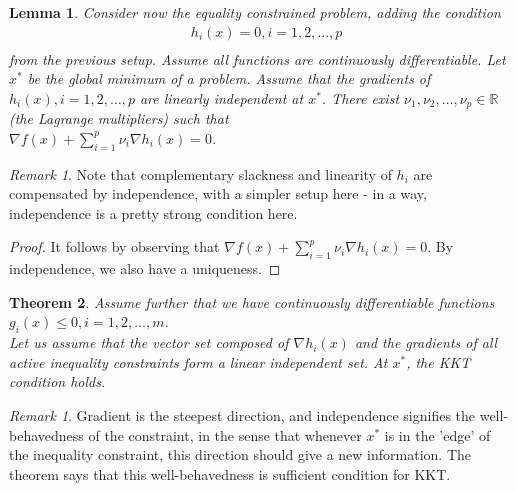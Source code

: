 \documentclass{article}
\newtheorem{theorem}{Theorem}
\newtheorem{lemma}[theorem]{Lemma}
\theoremstyle{remark}
\newtheorem{remark}[example]{Remark}
\begin{document}
\begin{lemma}
Consider now the equality constrained problem, adding the condition\\
\begin{align*}
        & h_i(x)=0,i=1,2,\dots,p\\
\end{align*}
from the previous setup. Assume all functions are continuously differentiable. 
Let $x^*$ be the global minimum of a problem. Assume that
 the gradients of $h_i(x),i=1,2,\dots,p$ are linearly independent at $x^*$. There
  exist $\nu_1,\nu_2,\dots,\nu_p\in\mathbb{R}$ (the Lagrange multipliers) such that\\
  $\nabla f(x)+\sum^p_{i=1}\nu_i\nabla h_i(x)=0$.
\end{lemma}
\begin{remark}
\item Note that complementary slackness and linearity of $h_i$ are compensated by independence, with a 
simpler setup here - in a way, independence is a pretty strong condition here.
\item 
\end{remark}
\begin{proof}
It follows by observing that $\nabla f(x)+\sum_{i=1}^p\nu_i\nabla h_i(x)=0.$ By independence,
 we also have a uniqueness.
\end{proof}
\begin{theorem}
Assume further that we have continuously differentiable functions $g_i(x)\leq 0,i=1,2,\dots,m$.\\
Let us assume that the vector set composed of $\nabla h_i(x)$ and the gradients of all active inequality constraints
 form a linear independent set. At $x^*$, the KKT condition holds.
\end{theorem}
\begin{remark}
\item Gradient is the steepest direction, and independence signifies the well-behavedness of
 the constraint, in the sense that whenever $x^*$ is in the 'edge' of the inequality constraint, this direction should give a new information. The
  theorem says that this well-behavedness is sufficient condition for KKT.
\end{remark}
\end{document}
